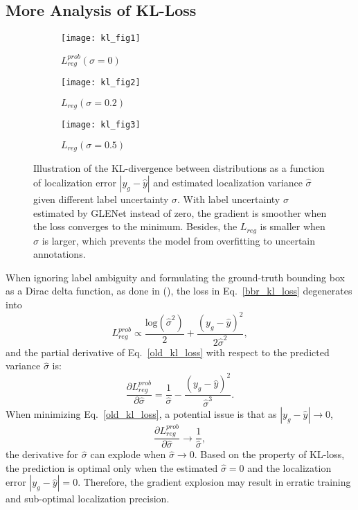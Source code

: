 \documentclass[twocolumn]{svjour3}
\begin{document}
\subsection{More Analysis of KL-Loss} \label{sec:theoretical analysis}
\begin{figure*}[htp]
\begin{subfigure}{.33\textwidth}
\centering
\texttt{[image: kl\_fig1]}
\caption{$L_{reg}^{prob} (\sigma=0)$}
\label{kl_fig1}
\end{subfigure}
\begin{subfigure}{.33\textwidth}
\centering
\texttt{[image: kl\_fig2]}
\caption{$L_{reg} (\sigma=0.2)$}
\label{kl_fig2}
\end{subfigure}
\begin{subfigure}{.33\textwidth}
\centering
\texttt{[image: kl\_fig3]}
\caption{$L_{reg} (\sigma=0.5)$}
\label{kl_fig3}
\end{subfigure}
\caption{Illustration of the KL-divergence between distributions as a function of localization error $|y_g-\hat{y}|$ and estimated localization variance $\hat{\sigma}$ given different label uncertainty $\sigma$. With label uncertainty $\sigma$ estimated by GLENet instead of zero, the gradient is smoother when the loss converges to the minimum. Besides, the $L_{reg}$ is smaller when $\sigma$ is larger, which prevents the model from overfitting to uncertain annotations.}
\label{fig:loss_surface}
\end{figure*}

When ignoring label ambiguity and formulating the ground-truth bounding box as a Dirac delta function, as done in (\cite{bbr}), the loss in Eq.~\eqref{bbr_kl_loss} degenerates into
\begin{equation}\label{old_kl_loss}
L_{reg}^{prob} 
\propto \dfrac{\mathrm{log}(\hat{\sigma}^2)}{2} + \dfrac{(y_g-\hat{y})^2}{2\hat{\sigma}^2},
\end{equation}
and the partial derivative of Eq.~\eqref{old_kl_loss} with respect to the predicted variance $\hat{\sigma}$ is:
\begin{equation}
\frac{\partial L_{reg}^{prob}}{\partial \hat{\sigma } } =\frac{1}{\hat{\sigma}} - \frac{(y_g-\hat{y})^2}{\hat{\sigma}^3}.
\end{equation}
When minimizing Eq.~\eqref{old_kl_loss}, a potential issue is that as $|y_g-\hat{y}|\to 0$,
\begin{equation}
\frac{\partial L_{reg}^{prob}}{\partial \hat{\sigma } } \to \frac{1}{\hat{\sigma}},
\end{equation}
the derivative for $\hat{\sigma}$ can explode when $\hat{\sigma}\to0$.
Based on the property of KL-loss, the prediction is optimal only when the estimated $\hat{\sigma}=0$ and the localization error $|y_g-\hat{y}|=0$.
Therefore, the gradient explosion may result in erratic training and sub-optimal localization precision.
\end{document}
